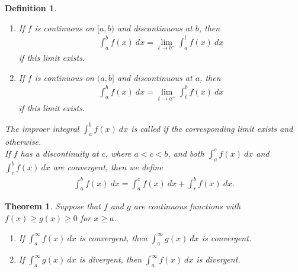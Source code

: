 \documentclass{article}
\theoremstyle{sltheorem}
\newtheorem{definition}{Definition}[section]
\newtheorem{theorem}{Theorem}[section]
\begin{document}
\begin{definition}
    \begin{enumerate}
        \item If $f$ is continuous on $[a,b)$ and discontinuous at $b$, then
        \begin{align*}
            \int_a^b f(x)\:dx = \lim_{t\to b^-}\int_a^t f(x)\: dx
        \end{align*}
        if this limit exists.
        \item If $f$ is continuous on $(a,b]$ and discontinuous at $a$, then
        \begin{align*}
            \int_a^b f(x)\:dx = \lim_{t\to a^+}\int_t^b f(x)\: dx
        \end{align*}
        if this limit exists.
    \end{enumerate}
    The improer integral $\int_a^b f(x)\:dx$ is called  if the corresponding limit exists and  otherwise.\\
    If $f$ has a discontinuity at $c$, where $a<c<b$, and both $\int_a^c f(x)\:dx$ and $\int_c^b f(x)\:dx$ are convergent, then we define
    \begin{align*}
        \int_a^b f(x)\: dx = \int_a^c f(x)\:dx + \int_c^b f(x)\:dx.
    \end{align*}
\end{definition}
\begin{theorem}
     Suppose that $f$ and $g$ are continuous functions with $f(x)\geq g(x)\geq 0$ for $x\geq a$.
    \begin{enumerate}
        \item If $\int_a^\infty f(x)\:dx$ is convergent, then $\int_a^\infty g(x)\:dx$ is convergent.
        \item If $\int_a^\infty g(x)\:dx$ is divergent, then $\int_a^\infty f(x)\:dx$ is divergent.
    \end{enumerate}
\end{theorem}
\end{document}

